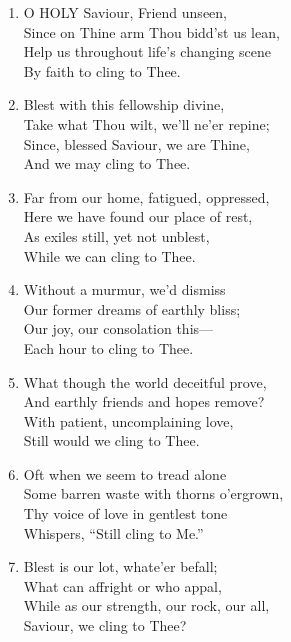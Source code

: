 \begin{enumerate}
    \item O HOLY Saviour, Friend unseen, \\
        Since on Thine arm Thou bidd'st us lean, \\
        Help us throughout life's changing scene \\
        By faith to cling to Thee.

    \item Blest with this fellowship divine, \\
        Take what Thou wilt, we'll ne'er repine; \\
        Since, blessed Saviour, we are Thine, \\
        And we may cling to Thee.

    \item Far from our home, fatigued, oppressed, \\
        Here we have found our place of rest, \\
        As exiles still, yet not unblest, \\
        While we can cling to Thee.

    \item Without a murmur, we'd dismiss \\
        Our former dreams of earthly bliss; \\
        Our joy, our consolation this--- \\
        Each hour to cling to Thee.

    \item What though the world deceitful prove, \\
        And earthly friends and hopes remove? \\
        With patient, uncomplaining love, \\
        Still would we cling to Thee.

    \item Oft when we seem to tread alone \\
        Some barren waste with thorns o'ergrown, \\
        Thy voice of love in gentlest tone \\
        Whispers, ``Still cling to Me.''

    \item Blest is our lot, whate'er befall; \\
        What can affright or who appal, \\
        While as our strength, our rock, our all, \\
        Saviour, we cling to Thee?

\end{enumerate}

